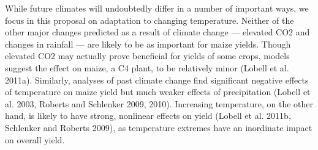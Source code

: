
While future climates will undoubtedly differ in a number of important ways, we focus in this proposal on adaptation to changing temperature.  Neither of the other major changes predicted as a result of climate change — elevated CO2 and changes in rainfall — are likely to be as important for maize yields.  Though elevated CO2 may actually prove beneficial for yields of some crops, models suggest the effect on maize, a C4 plant, to be relatively minor (Lobell et al. 2011a).  Similarly, analyses of past climate change find significant negative effects of temperature on maize yield but much weaker effects of precipitation (Lobell et al. 2003, Roberts and Schlenker 2009, 2010).  Increasing temperature, on the other hand, is likely to have strong, nonlinear effects on yield (Lobell et al. 2011b, Schlenker and Roberts 2009), as temperature extremes have an inordinate impact on overall yield.  

